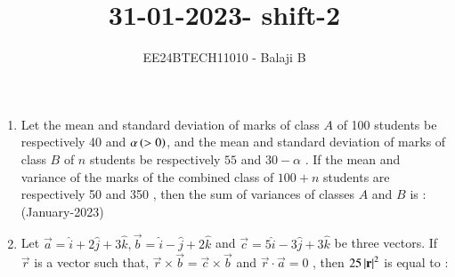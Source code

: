 \documentclass[journal]{IEEEtran}
\begin{document}

\vspace{3cm}

\title{31-01-2023- shift-2}
\author{EE24BTECH11010 - Balaji B}
{\let\newpage\relax\maketitle}
\begin{enumerate}
    \item Let the mean and standard deviation of marks of class $A$ of 100 students be respectively 40 and $\alpha \left(>0\right)$, and the mean and standard deviation of marks of class $B$
 of $n$
 students be respectively $55$ and $30-\alpha$ 
. If the mean and variance of the marks of the combined class of $100 + n$
 students are respectively 50 and 350 , then the sum of variances of classes $A$
 and $B$
 is : \hfill (January-2023)
 \begin{enumerate}
 \end{enumerate}
\item Let $\vec{a} = \hat{i} + 2\hat{j}+3\hat{k}, \vec{b} = \hat{i} - \hat{j}+ 2\hat{k}$
 and $\vec{c} = 5\hat{i} - 3\hat{j} + 3\hat{k}$
 be three vectors. If $\vec{r}$
 is a vector such that, $\vec{r} \times \vec{b} = \vec{c} \times \vec{b}$
 and $\vec{r} \cdot \vec{a} = 0$
, then $25\left\vert\mathbf{r}\right\vert^2$
 is equal to : 
 

\end{enumerate}
\end{document}
